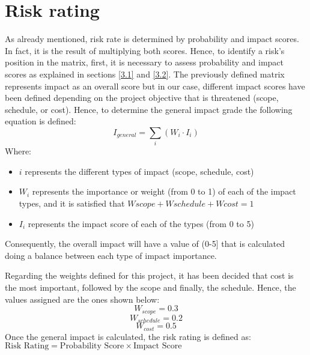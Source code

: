 \section{Risk rating}
\label{3.4}
As already mentioned, risk rate is determined by probability and impact scores. In fact, it is the result of multiplying both scores. Hence, to identify a risk’s position in the matrix, first, it is necessary to assess probability and impact scores as explained in sections \ref{3.1} and \ref{3.2}.
The previously defined matrix represents impact as an overall score but in our case, different impact scores have been defined depending on the project objective that is threatened (scope, schedule, or cost). Hence, to determine the general impact grade the following equation is defined:
\begin{equation}
I_{general}=\sum_{i}(W_i\cdot I_i)
\end{equation}
Where:
\begin{itemize}
	\item $i$ represents the different types of impact (scope, schedule, cost)
	\item $W_i$ represents the importance or weight (from 0 to 1) of each of the impact types, and it is satisfied that $Wscope + Wschedule + Wcost = 1$
	\item $I_i$ represents the impact score of each of the types (from 0 to 5)
\end{itemize}

Consequently, the overall impact will have a value of (0-5] that is calculated doing a balance between each type of impact importance.

Regarding the weights defined for this project, it has been decided that cost is the most important, followed by the scope and finally, the schedule. Hence, the values assigned are the ones shown  below:
	$$W_{scope}=0.3$$
	$$W_{schedule}=0.2$$
	$$W_{cost}=0.5$$
Once the general impact is calculated, the risk rating is defined as:
$\text{Risk Rating}=\text{Probability Score}\times \text{Impact Score}$

